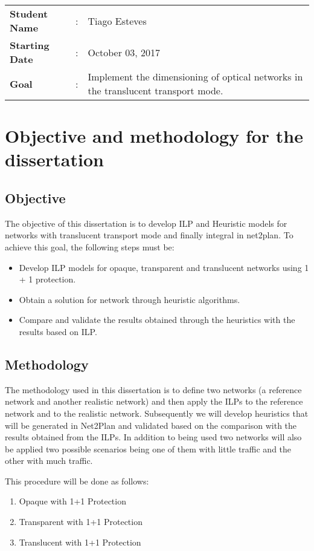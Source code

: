 \clearpage

\begin{tcolorbox}	
\begin{tabular}{p{2.75cm} p{0.2cm} p{10.5cm}} 	
\textbf{Student Name}  &:& Tiago Esteves\\
\textbf{Starting Date} &:& October 03, 2017\\
\textbf{Goal}          &:& Implement the dimensioning of optical networks in the translucent transport mode.
\end{tabular}
\end{tcolorbox}

\section{Objective and methodology for the dissertation}

\subsection{Objective}
The objective of this dissertation is to develop ILP and Heuristic models for networks with translucent transport mode and finally integral in net2plan.
To achieve this goal, the following steps must be:
\begin{itemize}
  \item Develop ILP models for opaque, transparent and translucent networks using 1 + 1 protection.
  \item Obtain a solution for network through heuristic algorithms.
  \item Compare and validate the results obtained through the heuristics with the results based on ILP.
\end{itemize}

\subsection{Methodology}
The methodology used in this dissertation is to define two networks (a reference network and another realistic network) and then apply the ILPs to the reference network and to the realistic network.
Subsequently we will develop heuristics that will be generated in Net2Plan and validated based on the comparison with the results obtained from the ILPs.
In addition to being used two networks will also be applied two possible scenarios being one of them with little traffic and the other with much traffic.

This procedure will be done as follows:
\begin{enumerate}
  \item Opaque with 1+1 Protection
  \item Transparent with 1+1 Protection
  \item Translucent with 1+1 Protection
\end{enumerate}
